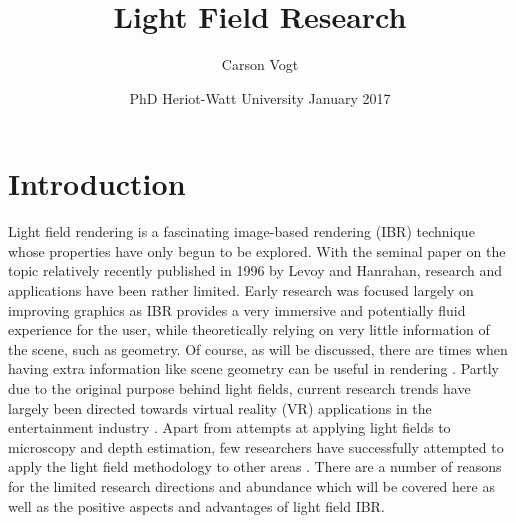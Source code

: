 \documentclass[12pt]{report}
\begin{document}
\title{Light Field Research \vspace{2.5cm}}	%
\author{
\Large Carson Vogt \vspace{1cm} \\ 
}

\date{
	\centering
	PhD \endgraf\medskip
	Heriot-Watt University \endgraf{} January 2017
}

\maketitle

\listoffigures

\tableofcontents

\chapter{Introduction}
Light field rendering is a fascinating image-based rendering (IBR) technique whose properties have only begun to be explored. With the seminal paper on the topic relatively recently published in 1996 by Levoy and Hanrahan\cite{Levoy96}, research and applications have been rather limited. Early research was focused largely on improving graphics as IBR provides a very immersive and potentially fluid experience for the user, while theoretically relying on very little information of the scene, such as geometry. Of course, as will be discussed, there are times when having extra information like scene geometry can be useful in rendering \cite{Gortler96}. Partly due to the original purpose behind light fields, current research trends have largely been directed towards virtual reality (VR) applications in the entertainment industry \cite{Anderson16, Davis12, Kalantari16}. Apart from attempts at applying light fields to microscopy and depth estimation, few researchers have successfully attempted to apply the light field methodology to other areas \cite{Levoy06b}. There are a number of reasons for the limited research directions and abundance which will be covered here as well as the positive aspects and advantages of light field IBR.
\end{document}
